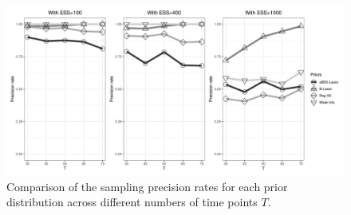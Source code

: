 \documentclass[a4paper,12pt]{article}
\begin{document}
\begin{figure}[h]
\centering 
\includegraphics[width=15cm]{prec1004001000.jpg}
\caption{Comparison of the sampling precision rates for each prior distribution across different numbers of time points $T$. }
\label{fig:prec2}
\end{figure}
\end{document}
